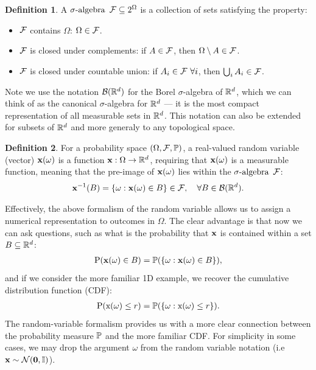 \documentclass[a4paper,12pt,twoside,openright]{report}
\theoremstyle{definition}
\newtheorem{definition}{Definition}[section]
\begin{document}
\begin{definition}\label{def:sigma_algebra}
A $\sigalg$ $\calF \subseteq 2^{\Omega}$ is a collection of sets satisfying the property:
\begin{itemize}
    \item $\calF$ contains $\Omega$: $\Omega \in \calF$.
    \item $\calF$ is closed under complements: if $A\in\calF$, then $\Omega \setminus A \in \calF$.
    \item $\calF$ is closed under countable union:  if $A_i \in \calF \ \forall i$, then $\bigcup_i A_i \in \calF$.
\end{itemize}
\end{definition}

Note we use the notation $\calB(\R^d)$ for the Borel $\sigma$-algebra of $\R^d$, which we can think of as the canonical $\sigma$-algebra for $\R^d$ --- it is the most compact representation of all measurable sets in $\R^d$. This notation can also be extended for subsets of $\R^d$ and more generaly to any topological space.

\begin{definition}\label{def:random_variable}
For a probability space $\probspace$, a real-valued random variable (vector) $\rvx(\omega)$ is a function $\rvx :\Omega \rightarrow \R^d$, requiring that $\rvx(\omega)$ is a measurable function, meaning that the pre-image of $\rvx(\omega)$  lies within the $\sigalg$ $\calF$:
\begin{align*}
    \rvx^{-1}(B)= \{\omega : \rvx(\omega) \in B \} \in \calF, \quad \forall B \in \calB(\R^d).
\end{align*}
\end{definition}
Effectively, the above formalism of the random variable allows us to assign a numerical representation to outcomes in $\Omega$. The clear advantage is that now we can ask questions, such as what is the probability that $\rvx$ is contained within a set $B \subseteq \R^d$:
\begin{align*}
     \text{P}(\rvx(\omega) \in B) = \P( \{\omega : \rvx(\omega) \in B \} ),
\end{align*}
 and if we consider the more familiar 1D example, we recover the cumulative distribution function (CDF):
 \begin{align*}
     \text{P}(\rx(\omega) \leq r) = \P( \{\omega : \rx(\omega) \leq r \} ).
 \end{align*}
 The random-variable formalism provides us with a more clear connection between the probability measure $\P$ and the more familiar CDF. For simplicity in some cases, we may drop the argument $\omega$ from the random variable notation (i.e $\rvx \sim \calN(\bm{0}, \mathbb{I})$). 
\end{document}
